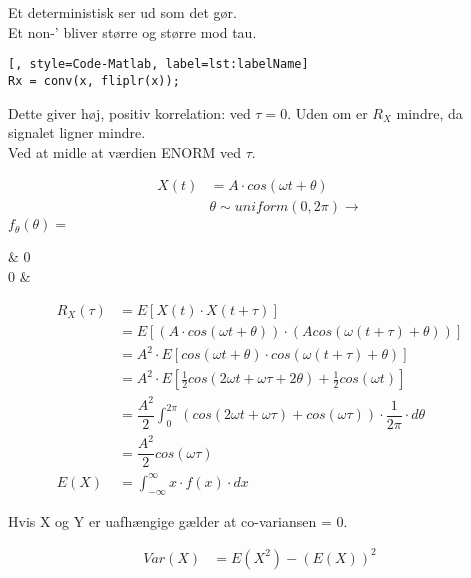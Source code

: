 \documentclass[Main]{subfiles}
\begin{document}
\begin{theo}
Et deterministisk ser ud som det gør.
\\
Et non-' bliver større og større mod tau.
\begin{lstlisting}[, style=Code-Matlab, label=lst:labelName]
Rx = conv(x, fliplr(x));
\end{lstlisting}
Dette giver høj, positiv korrelation: ved $\tau = 0$. 
Uden om er $R_X$ mindre, da signalet ligner mindre.
\\
Ved at midle at værdien ENORM ved $\tau$.
\end{theo}

\begin{theo}[Eksempel]
\begin{align*}
X(t) &= A \cdot cos(\omega t + \theta)\\
	& \theta \sim uniform(0, 2 \pi) \rightarrow
\end{align*}
$f_\theta (\theta) =$
\begin{FunArg} 
 & 0 \leq \theta {}\pi \\
0 & 
\end{FunArg}

\begin{align*}
R_X(\tau) &= E[X(t) \cdot X(t+\tau)] \\
	&= E[(A \cdot cos(\omega t+\theta)) \cdot (A cos(\omega (t+\tau) + \theta))] \\
	&= A^2 \cdot E[cos( \omega t+ \theta) \cdot cos(\omega (t+\tau)+\theta)] \\
	&= A^2 \cdot E\left[\frac{1}{2} cos(2\omega t+\omega \tau + 2 \theta) + \frac{1}{2} cos( \omega t)\right] \\
	&= \dfrac{A^2}{2} \int_0^{2 \pi} (cos (2 \omega t + \omega \tau) + cos(\omega \tau)) \cdot \dfrac{1}{2 \pi} \cdot d\theta \\
	&= \dfrac{A^2}{2} cos( \omega \tau) \\
E(X) &= \int_{-\infty}^\infty x \cdot f(x) \cdot dx
\end{align*}

\end{theo}

Hvis X og Y er uafhængige gælder at co-variansen = 0.
\begin{theo}[Regneregler, L6S25]
\begin{align*}
Var(X) &= E(X^2)- (E(X))^2 \\
\end{align*}
\end{theo}




\end{document}
